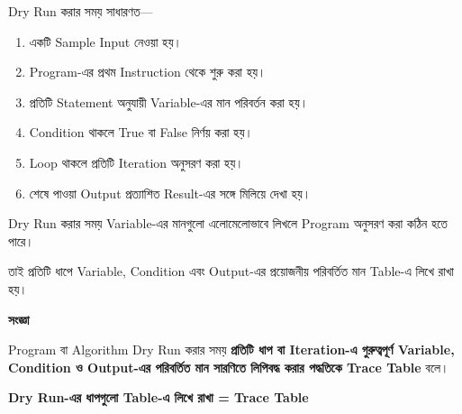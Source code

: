 
Dry Run করার সময় সাধারণত—

\begin{enumerate}

\item একটি Sample Input নেওয়া হয়।

\item Program-এর প্রথম Instruction থেকে শুরু করা হয়।

\item প্রতিটি Statement অনুযায়ী Variable-এর মান পরিবর্তন করা হয়।

\item Condition থাকলে True বা False নির্ণয় করা হয়।

\item Loop থাকলে প্রতিটি Iteration অনুসরণ করা হয়।

\item শেষে পাওয়া Output প্রত্যাশিত Result-এর সঙ্গে মিলিয়ে দেখা হয়।

\end{enumerate}


Dry Run করার সময় Variable-এর মানগুলো এলোমেলোভাবে লিখলে
Program অনুসরণ করা কঠিন হতে পারে।

তাই প্রতিটি ধাপে Variable, Condition এবং Output-এর প্রয়োজনীয়
পরিবর্তিত মান Table-এ লিখে রাখা হয়।


\begin{definitionbox}

\textbf{\color{darkTeal}সংজ্ঞা}

Program বা Algorithm Dry Run করার সময়
\textbf{প্রতিটি ধাপ বা Iteration-এ গুরুত্বপূর্ণ Variable,
Condition ও Output-এর পরিবর্তিত মান সারণিতে লিপিবদ্ধ করার
পদ্ধতিকে Trace Table} বলে।

\end{definitionbox}

\begin{center}

\textbf{
Dry Run-এর ধাপগুলো Table-এ লিখে রাখা
=
Trace Table
}

\end{center}

